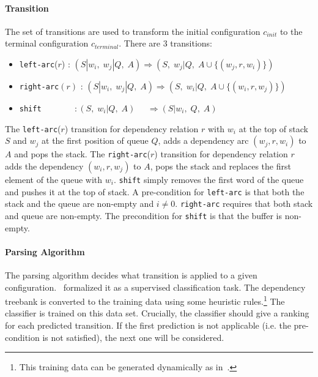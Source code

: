 \documentclass[12pt,twoside,final,hidelinks]{ltthesis}
\theoremstyle{definition}
\begin{document}
\paragraph{Transition}
The set of transitions are used to transform the initial configuration $c_{init}$ to the terminal configuration $c_{terminal}$. There are 3 transitions:
\begin{itemize}
\item \texttt{left-arc}($r$)\;\; : $(S|w_i,\; w_j|Q,\; A) \Rightarrow (S,\;w_j|Q,\; A\cup \{(w_j,r,w_i)\})$
\item \texttt{right-arc}$(r)$ : $(S|w_i,\; w_j|Q,\; A) \Rightarrow (S,\;w_i|Q,\; A\cup \{(w_i,r,w_j)\})$
\item \texttt{shift}$ \;\;\;\;\;\;\;\;\;\;\;\;\;\;: (S,\; w_i|Q,\; A) \;\;\;\;\;\Rightarrow (S|w_i,\;Q,\; A)$
\end{itemize}

The \texttt{left-arc}($r$) transition for dependency relation $r$ with $w_i$ at the top of stack $S$ and $w_j$ at the first position of queue $Q$, adds a dependency arc $(w_j,r,w_i)$ to $A$ and pops the stack. The \texttt{right-arc}($r$) transition for dependency relation $r$ adds the dependency $(w_i,r,w_j)$ to $A$, pops the stack and replaces the first element of the queue with $w_i$. \texttt{shift} simply removes the first word of the queue and pushes it at the top of stack. 
A pre-condition for \texttt{left-arc} is that both the stack and the queue are non-empty and $i\neq0$. 
\texttt{right-arc} requires that both stack and queue are non-empty. The precondition for \texttt{shift} is that the buffer is non-empty. 

\paragraph{Parsing Algorithm}
The parsing algorithm decides what transition is applied to a given configuration.~ formalized it as a supervised classification task. The dependency treebank is converted to the training data using some heuristic rules.\footnote{This training data can be generated dynamically as in~.} The classifier is trained on this data set. Crucially, the classifier should give a ranking for each predicted transition.
If the first prediction is not applicable (i.e. the pre-condition is not satisfied), the next one will be considered. 
\end{document}
